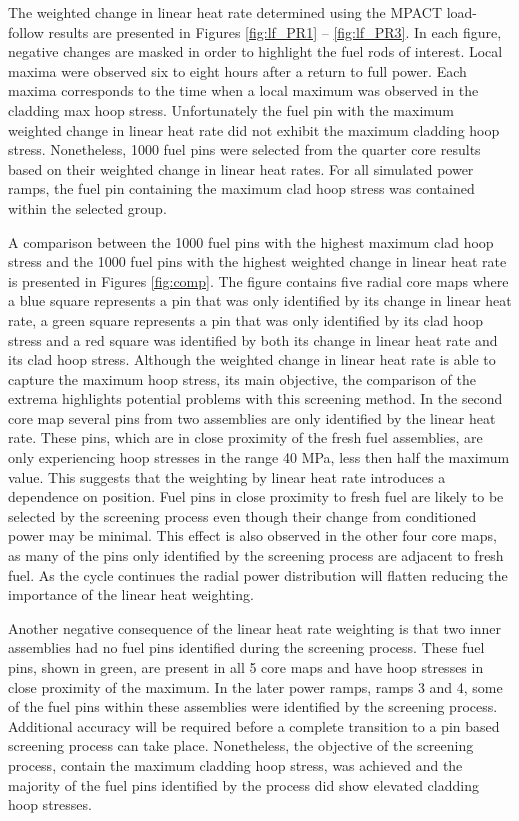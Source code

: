 \documentclass[edeposit,fullpage,11pt]{uiucthesis2009}
\begin{document}
The weighted change in linear heat rate determined using the MPACT load-follow results are presented in Figures \ref{fig:lf_PR1} -- \ref{fig:lf_PR3}.
In each figure, negative changes are masked in order to highlight the fuel rods of interest.
Local maxima were observed six to eight hours after a return to full power.
Each maxima corresponds to the time when a local maximum was observed in the cladding max hoop stress.
Unfortunately the fuel pin with the maximum weighted change in linear heat rate did not exhibit the maximum cladding hoop stress. 
Nonetheless, 1000 fuel pins were selected from the quarter core results based on their weighted change in linear heat rates.
For all simulated power ramps, the fuel pin containing the maximum clad hoop stress was contained within the selected group.
 
A comparison between the 1000 fuel pins with the highest maximum clad hoop stress and the 1000 fuel pins with the highest weighted change in linear heat rate is presented in Figures \ref{fig:comp}.
The figure contains five radial core maps where a blue square represents a pin that was only identified by its change in linear heat rate, a green square represents a pin that was only identified by its clad hoop stress and a red square was identified by both its change in linear heat rate and its clad hoop stress.
Although the weighted change in linear heat rate is able to capture the maximum hoop stress, its main objective, the comparison of the extrema highlights potential problems with this screening method.
In the second core map several pins from two assemblies are only identified by the linear heat rate.
These pins, which are in close proximity of the fresh fuel assemblies, are only experiencing hoop stresses in the range 40 MPa, less then half the maximum value.
This suggests that the weighting by linear heat rate introduces a dependence on position.
Fuel pins in close proximity to fresh fuel are likely to be selected by the screening process even though their change from conditioned power may be minimal.
This effect is also observed in the other four core maps, as many of the pins only identified by the screening process are adjacent to fresh fuel.
As the cycle continues the radial power distribution will flatten reducing the importance of the linear heat weighting.

Another negative consequence of the linear heat rate weighting is that two inner assemblies had no fuel pins identified during the screening process.
These fuel pins, shown in green, are present in all 5 core maps and have hoop stresses in close proximity of the maximum.
In the later power ramps, ramps 3 and 4, some of the fuel pins within these assemblies were identified by the screening process.
Additional accuracy will be required before a complete transition to a pin based screening process can take place.
Nonetheless, the objective of the screening process, contain the maximum cladding hoop stress, was achieved and the majority of the fuel pins identified by the process did show elevated cladding hoop stresses.
\end{document}

